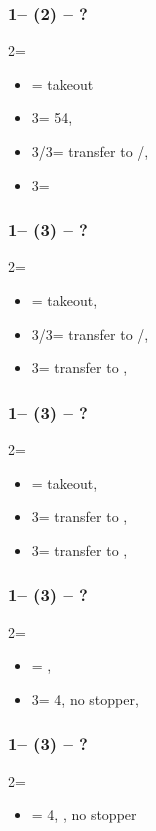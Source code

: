 \documentclass[12pt, a4paper]{article}
\begin{document}
\subsubsection*{1\clubs -- (2\nt) -- ?}
2\nt = \minor
\begin{itemize}
    \item \dbl = takeout
    \item 3\clubs = 54\major, \gf
    \item 3\diams/3\hearts = transfer to \hearts/\spades, \invp
    \item 3\spades = \nt
\end{itemize}

\subsubsection*{1\clubs -- (3\clubs) -- ?}
2\nt = \minor
\begin{itemize}
    \item \dbl = takeout, \gf
    \item 3\diams/3\hearts = transfer to \hearts/\spades, \invp
    \item 3\spades = transfer to \diams, \gf
\end{itemize}

\subsubsection*{1\clubs -- (3\diams) -- ?}
2\nt = \minor
\begin{itemize}
    \item \dbl = takeout, \gf
    \item 3\hearts = transfer to \spades, \invp
    \item 3\spades = transfer to \diams, \gf
\end{itemize}

\subsubsection*{1\clubs -- (3\hearts) -- ?}
2\nt = \minor
\begin{itemize}
    \item \dbl = \spades, \gf
    \item 3\spades = 4\spades, no \hearts stopper, \gf
\end{itemize}

\subsubsection*{1\clubs -- (3\spades) -- ?}
2\nt = \minor
\begin{itemize}
    \item \dbl = 4\hearts, \gf, no \spades stopper
\end{itemize}

\end{document}

